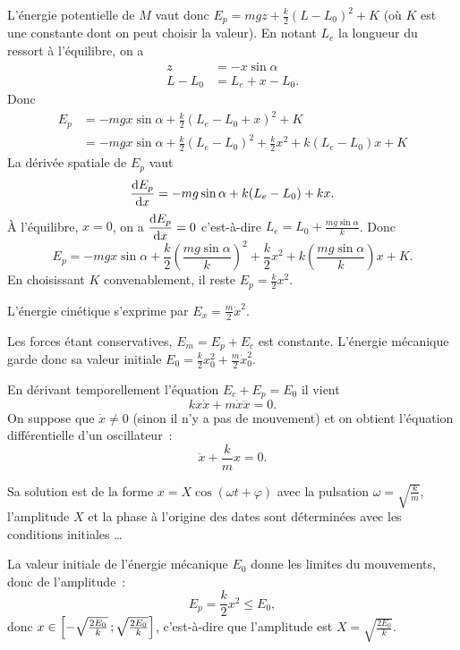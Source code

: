 L'énergie potentielle de \(M\) vaut donc \(E_p = mgz + \frac{k}{2}(L-L_0)^2 +K\) (où \(K\) est une constante dont on peut choisir la valeur). En notant \(L_e\) la longueur du ressort à l'équilibre, on a
\begin{align}
  z &= -x \sin \alpha \\
  L-L_0 &= L_e+x-L_0.
\end{align}
Donc
\begin{align}
  E_p &= -mgx \sin \alpha + \frac{k}{2}(L_e-L_0+x)^2 +K \\
  &= -mgx \sin \alpha + \frac{k}{2}(L_e-L_0)^2 +\frac{k}{2}x^2 + k(L_e-L_0)x+K
\end{align}
La dérivée spatiale de \(E_p\) vaut
\begin{equation}
  \dfrac{\mathrm{d} E_p}{\mathrm{d} x} = -mg\sin\alpha + k(L_e-L_0) + kx.
\end{equation}
À l'équilibre, \(x=0\), on a \(\dfrac{\mathrm{d} E_p}{\mathrm{d} x}=0\) c'est-à-dire \(L_e = L_0 + \frac{mg\sin\alpha}{k}\). Donc
\begin{equation}
  E_p = -mgx \sin \alpha + \frac{k}{2}\left(\frac{mg\sin\alpha}{k}\right)^2 +\frac{k}{2}x^2 + k\left(\frac{mg\sin\alpha}{k}\right)x+K.
\end{equation}
En choisissant \(K\) convenablement, il reste \(E_p = \frac{k}{2}x^2\).

L'énergie cinétique s'exprime par \(E_x = \frac{m}{2} \dot{x}^2\).

Les forces étant conservatives, \(E_m=E_p+E_c\) est constante. L'énergie mécanique garde donc sa valeur initiale \(E_0=\frac{k}{2}x_0^2 + \frac{m}{2}\dot{x}_0^2\).

En dérivant temporellement l'équation \(E_c+E_p=E_0\) il vient
\begin{equation}
  k x \dot{x} +m \dot{x}\ddot{x} =0.
\end{equation}
On suppose que \(\dot{x} \neq 0\) (sinon il n'y a pas de mouvement) et on obtient l'équation différentielle d'un oscillateur~:
\begin{equation}
  \ddot{x} + \frac{k}{m}x=0.
\end{equation}

Sa solution est de la forme \(x=X\cos(\omega t +\varphi)\) avec la pulsation \(\omega = \sqrt{\frac{k}{m}}\), l'amplitude \(X\) et la phase à l'origine des dates sont déterminées avec les conditions initiales \ldots

La valeur initiale de l'énergie mécanique \(E_0\) donne les limites du mouvements, donc de l'amplitude~:
\begin{equation}
  E_p=\frac{k}{2}x^2 \leq E_0,
\end{equation}
donc \(x \in \left[ -\sqrt{\frac{2E_0}{k}} \, ;  \sqrt{\frac{2E_0}{k}} \right]\), c'est-à-dire que l'amplitude est \(X=\sqrt{\frac{2E_0}{k}}\).

